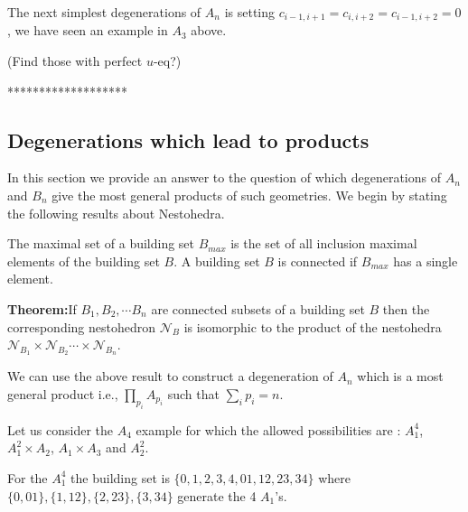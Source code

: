 \documentclass[hidelinks,12pt]{article}
\begin{document}
The next simplest degenerations of $A_n$ is setting $c_{i-1,i+1}=c_{i,i+2}=c_{i-1,i+2}=0$, we have seen an example in $A_3$ above.





(Find those with perfect $u$-eq?)

*******************
\subsection*{Degenerations which lead to products}
In this section we provide an answer to the question of which degenerations of $A_n$ and $B_n$ give the most general products of such geometries. We begin by stating the following results about Nestohedra.

The maximal set of a building set $B_{max}$ is the set of all inclusion maximal elements of the building set $B$. A building set $B$ is connected if $B_{max}$ has a single element.

{\bf Theorem:}If $B_1, B_2,\cdots B_n$ are connected subsets of a building set $B$ then the corresponding nestohedron ${\mathscr N_B}$ is isomorphic to the product of the nestohedra ${\mathscr N}_{ B_1} \times{\mathscr N}_{ B_2} \cdots \times {\mathscr N}_{B_n}$.

We can use the above result to construct 	a degeneration of $A_n$ which is a most general product i.e., $\prod_{p_i} A_{p_i}$ such that $\sum_{i} p_{i} = n$. 

Let us consider the  $A_4$ example for which the allowed possibilities are : $A_1^{4}$, $A_1^2 \times A_2$, $A_1 \times A_3$ and $A^{2}_2$.
 
For the $A_1^{4}$ the building set is $ \{ {0},{1},{2},{3},{4},{01},{12},{23},{34} \}$ where $\{0,01\} , \{1,12\},\{2,23\},\{3,34\}$ generate the 4 $A_1$'s.
\end{document}
